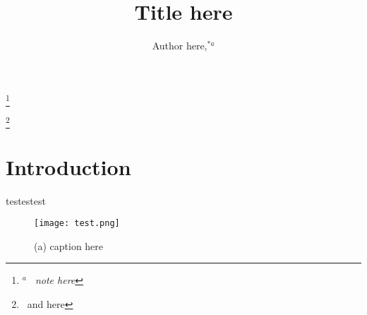 \documentclass[12pt, a4paper, twocolumn]{article}
\title{Title here}
\author{Author here,\ddag\textit{$^{\ast a}$}}
\date{}
\newcommand\blfootnote[1]{%
  \begingroup
  \renewcommand\thefootnote{}\footnote{#1}%
  \addtocounter{footnote}{-1}%
  \endgroup
}
\begin{document}


\blfootnote{\textit{$^{a}$~ note here}}

\blfootnote{\ddag~and here}

\section{Introduction}
testestest

\begin{figure}[h]
  \centering
    \texttt{[image: test.png]}
    \caption{(a) caption here }
    \label{fig1}
  \end{figure}

\renewcommand\refname{References}

 
\end{document}
